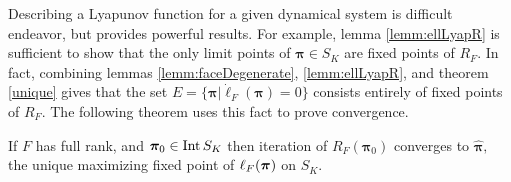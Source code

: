 Describing a Lyapunov function for a given dynamical system is difficult endeavor, but provides powerful results.  For example, lemma \ref{lemm:ellLyapR} is sufficient to show that the only limit points of \( \bm\pi\in S_K \) are fixed points of \( R_F \).  In fact, combining lemmas \ref{lemm:faceDegenerate}, \ref{lemm:ellLyapR}, and theorem \ref{unique} gives that the set \( E = \{\bm\pi|\dot{\ell}_F(\bm\pi) = 0\} \) consists entirely of fixed points of \( R_F \).  The following theorem uses this fact to prove convergence.

\begin{thm}\label{thm:convergence}
	If \( F \) has full rank, and \( \bm\pi_0\in \operatorname{Int}S_K\) then iteration of \( R_F(\bm\pi_0) \) converges to \( \hat{\bm\pi}, \) the unique maximizing fixed point of \( \ell_{F}({\bm\pi}) \) on \( S_K.\)
	
\end{thm}


